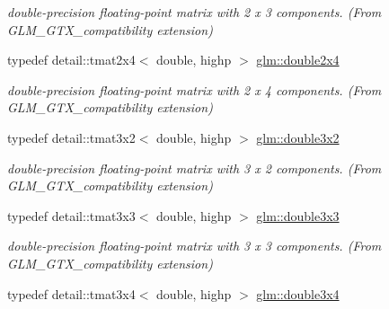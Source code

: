 \begin{DoxyCompactItemize}
\begin{DoxyCompactList}\small\item\em double-\/precision floating-\/point matrix with 2 x 3 components. (From G\+L\+M\+\_\+\+G\+T\+X\+\_\+compatibility extension) \end{DoxyCompactList}\item 
typedef detail\+::tmat2x4$<$ double, highp $>$ \hyperlink{group__gtx__compatibility_ga063ad3c07c7650955da6ec55819f11fe}{glm\+::double2x4}\hypertarget{group__gtx__compatibility_ga063ad3c07c7650955da6ec55819f11fe}{}\label{group__gtx__compatibility_ga063ad3c07c7650955da6ec55819f11fe}

\begin{DoxyCompactList}\small\item\em double-\/precision floating-\/point matrix with 2 x 4 components. (From G\+L\+M\+\_\+\+G\+T\+X\+\_\+compatibility extension) \end{DoxyCompactList}\item 
typedef detail\+::tmat3x2$<$ double, highp $>$ \hyperlink{group__gtx__compatibility_ga1f70107ac850f512ac4e09737e1f85b7}{glm\+::double3x2}\hypertarget{group__gtx__compatibility_ga1f70107ac850f512ac4e09737e1f85b7}{}\label{group__gtx__compatibility_ga1f70107ac850f512ac4e09737e1f85b7}

\begin{DoxyCompactList}\small\item\em double-\/precision floating-\/point matrix with 3 x 2 components. (From G\+L\+M\+\_\+\+G\+T\+X\+\_\+compatibility extension) \end{DoxyCompactList}\item 
typedef detail\+::tmat3x3$<$ double, highp $>$ \hyperlink{group__gtx__compatibility_ga2b56fa7536ae728c64fde99d6618139a}{glm\+::double3x3}\hypertarget{group__gtx__compatibility_ga2b56fa7536ae728c64fde99d6618139a}{}\label{group__gtx__compatibility_ga2b56fa7536ae728c64fde99d6618139a}

\begin{DoxyCompactList}\small\item\em double-\/precision floating-\/point matrix with 3 x 3 components. (From G\+L\+M\+\_\+\+G\+T\+X\+\_\+compatibility extension) \end{DoxyCompactList}\item 
typedef detail\+::tmat3x4$<$ double, highp $>$ \hyperlink{group__gtx__compatibility_gab38107892c0116610e7de83126aff405}{glm\+::double3x4}\hypertarget{group__gtx__compatibility_gab38107892c0116610e7de83126aff405}{}\label{group__gtx__compatibility_gab38107892c0116610e7de83126aff405}


\end{DoxyCompactItemize}
